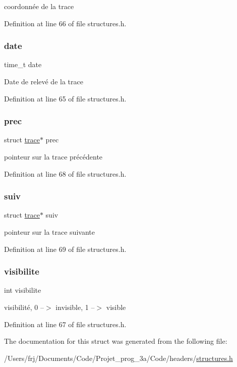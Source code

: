 coordonnée de la trace 

Definition at line 66 of file structures.\+h.

\hypertarget{structtrace_afd1d5f3476eea5753c7c59bfa90777ba}{}\label{structtrace_afd1d5f3476eea5753c7c59bfa90777ba} 
\subsubsection{\texorpdfstring{date}{date}}
{\footnotesize\ttfamily time\+\_\+t date}

Date de relevé de la trace 

Definition at line 65 of file structures.\+h.

\hypertarget{structtrace_a1967dba5ed4900e2f554b2442863e69e}{}\label{structtrace_a1967dba5ed4900e2f554b2442863e69e} 
\subsubsection{\texorpdfstring{prec}{prec}}
{\footnotesize\ttfamily struct \hyperlink{structtrace}{trace}$\ast$ prec}

pointeur sur la trace précédente 

Definition at line 68 of file structures.\+h.

\hypertarget{structtrace_ab7909a2cccd6f40ca9499c850c9c948c}{}\label{structtrace_ab7909a2cccd6f40ca9499c850c9c948c} 
\subsubsection{\texorpdfstring{suiv}{suiv}}
{\footnotesize\ttfamily struct \hyperlink{structtrace}{trace}$\ast$ suiv}

pointeur sur la trace suivante 

Definition at line 69 of file structures.\+h.

\hypertarget{structtrace_aa34b47a3ed3a7dfed8a672132bcc3f2a}{}\label{structtrace_aa34b47a3ed3a7dfed8a672132bcc3f2a} 
\subsubsection{\texorpdfstring{visibilite}{visibilite}}
{\footnotesize\ttfamily int visibilite}

visibilité, 0 --$>$ invisible, 1 --$>$ visible 

Definition at line 67 of file structures.\+h.



The documentation for this struct was generated from the following file\+:\begin{DoxyCompactItemize}
\item 
/\+Users/frj/\+Documents/\+Code/\+Projet\+\_\+prog\+\_\+3a/\+Code/headers/\hyperlink{structures_8h}{structures.\+h}\end{DoxyCompactItemize}
